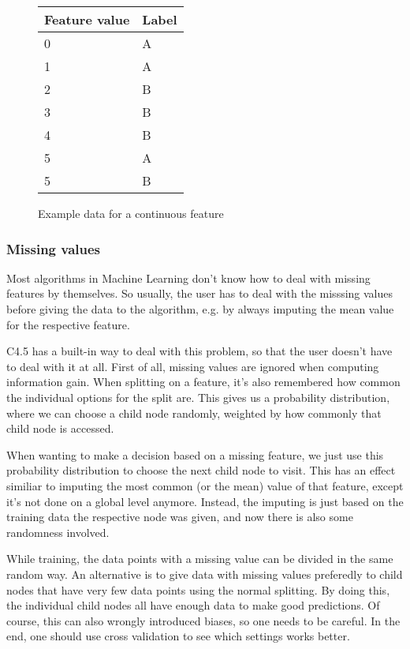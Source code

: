 \documentclass[a4paper]{article}
\begin{document}
\begin{figure}
	\centering
  \begin{tabular}{l|l}
      \textbf{Feature value} & \textbf{Label} \\
      \hline
      0 & A \\
      1 & A \\
      2 & B \\
      3 & B \\
      4 & B \\
      5 & A \\
      5 & B
  \end{tabular}

  \label{continuous-feature}
  \caption{Example data for a continuous feature}
\end{figure}

\subsubsection{Missing values}

Most algorithms in Machine Learning don't know how to deal with missing features by themselves. So usually, the user has to deal with the misssing values before giving the data to the algorithm, e.g. by always imputing the mean value for the respective feature.

C4.5 has a built-in way to deal with this problem, so that the user doesn't have to deal with it at all. First of all, missing values are ignored when computing information gain. When splitting on a feature, it's also remembered how common the individual options for the split are. This gives us a probability distribution, where we can choose a child node randomly, weighted by how commonly that child node is accessed.

When wanting to make a decision based on a missing feature, we just use this probability distribution to choose the next child node to visit. This has an effect similiar to imputing the most common (or the mean) value of that feature, except it's not done on a global level anymore. Instead, the imputing is just based on the training data the respective node was given, and now there is also some randomness involved.

While training, the data points with a missing value can be divided in the same random way. An alternative is to give data with missing values preferedly to child nodes that have very few data points using the normal splitting. By doing this, the individual child nodes all have enough data to make good predictions. Of course, this can also wrongly introduced biases, so one needs to be careful. In the end, one should use cross validation to see which settings works better.
\end{document}
